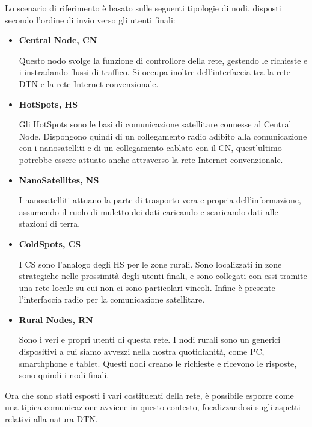 \documentclass[12pt,a4paper,oneside]{book}
\begin{document}
		Lo scenario di riferimento è basato sulle seguenti tipologie di nodi, disposti secondo l'ordine di invio verso gli utenti finali:
		\begin{itemize}
			\item {\bf Central Node, CN}
			
			Questo nodo svolge la funzione di controllore della rete, gestendo le richieste e i instradando flussi di traffico. Si occupa inoltre dell'interfaccia tra la rete DTN e la rete Internet convenzionale.
			
			\item {\bf HotSpots, HS}
			
			Gli HotSpots sono le basi di comunicazione satellitare connesse al Central Node. Dispongono quindi di un collegamento radio adibito alla comunicazione con i nanosatelliti e di un collegamento cablato con il CN, quest'ultimo potrebbe essere attuato anche attraverso la rete Internet convenzionale. 
			
			\item {\bf NanoSatellites, NS}
			
			I nanosatelliti attuano la parte di trasporto vera e propria dell'informazione, assumendo il ruolo di muletto dei dati caricando e scaricando dati alle stazioni di terra.
			
			\item {\bf ColdSpots, CS}
			
			I CS sono l'analogo degli HS per le zone rurali. Sono localizzati in zone strategiche nelle prossimità degli utenti finali, e sono collegati con essi tramite una rete locale su cui non ci sono particolari vincoli. Infine è presente l'interfaccia radio per la comunicazione satellitare.
			
			\item {\bf Rural Nodes, RN}
			
			Sono i veri e propri utenti di questa rete. I nodi rurali sono un generici dispositivi a cui siamo avvezzi nella nostra quotidianità, come PC, smarthphone e tablet. Questi nodi creano le richieste e ricevono le risposte, sono quindi i nodi finali.  
						
		\end{itemize}
		
		Ora che sono stati esposti i vari costituenti della rete, è possibile esporre come una tipica comunicazione avviene in questo contesto, focalizzandosi sugli aspetti relativi alla natura DTN. 
		
\end{document}
